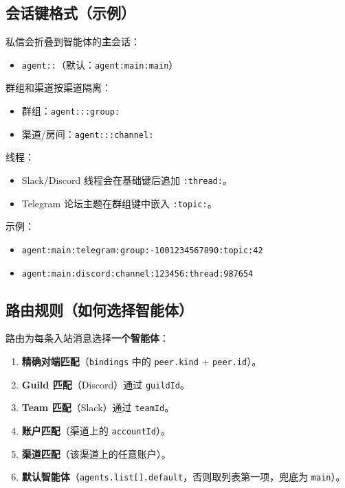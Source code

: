 \subsection{会话键格式（示例）}


私信会折叠到智能体的\textbf{主}会话：

\begin{itemize}
  \item \texttt{agent::}（默认：\texttt{agent:main:main}）
\end{itemize}


群组和渠道按渠道隔离：

\begin{itemize}
  \item 群组：\texttt{agent:::group:}
  \item 渠道/房间：\texttt{agent:::channel:}
\end{itemize}


线程：

\begin{itemize}
  \item Slack/Discord 线程会在基础键后追加 \texttt{:thread:}。
  \item Telegram 论坛主题在群组键中嵌入 \texttt{:topic:}。
\end{itemize}


示例：

\begin{itemize}
  \item \texttt{agent:main:telegram:group:-1001234567890:topic:42}
  \item \texttt{agent:main:discord:channel:123456:thread:987654}
\end{itemize}


\subsection{路由规则（如何选择智能体）}


路由为每条入站消息选择\textbf{一个智能体}：

\begin{enumerate}
  \item \textbf{精确对端匹配}（\texttt{bindings} 中的 \texttt{peer.kind} + \texttt{peer.id}）。
  \item \textbf{Guild 匹配}（Discord）通过 \texttt{guildId}。
  \item \textbf{Team 匹配}（Slack）通过 \texttt{teamId}。
  \item \textbf{账户匹配}（渠道上的 \texttt{accountId}）。
  \item \textbf{渠道匹配}（该渠道上的任意账户）。
  \item \textbf{默认智能体}（\texttt{agents.list[].default}，否则取列表第一项，兜底为 \texttt{main}）。
\end{enumerate}


